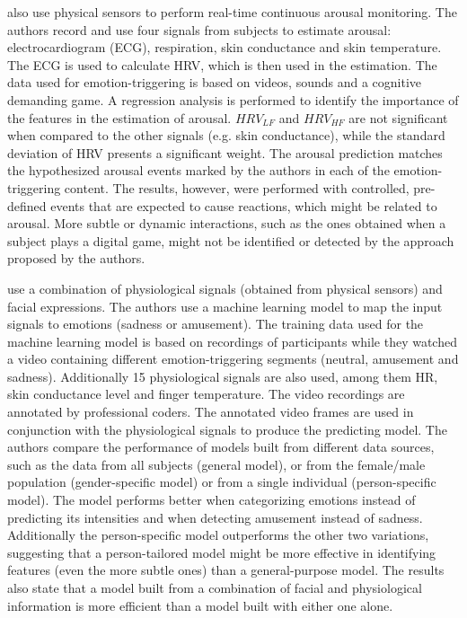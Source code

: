\textcite{grundlehner2009design} also use physical sensors to perform real-time continuous arousal monitoring. The authors record and use four signals from subjects to estimate arousal: electrocardiogram (ECG), respiration, skin conductance and skin temperature. The ECG is used to calculate HRV, which is then used in the estimation. The data used for emotion-triggering is based on videos, sounds and a cognitive demanding game. A regression analysis is performed to identify the importance of the features in the estimation of arousal. $HRV_{LF}$ and $HRV_{HF}$ are not significant when compared to the other signals (e.g. skin conductance), while the standard deviation of HRV presents a significant weight. The arousal prediction matches the hypothesized arousal events marked by the authors in each of the emotion-triggering content. The results, however, were performed with controlled, pre-defined events that are expected to cause reactions, which might be related to arousal. More subtle or dynamic interactions, such as the ones obtained when a subject plays a digital game, might not be identified or detected by the approach proposed by the authors.

\textcite{bailenson2008real} use a combination of physiological signals (obtained from physical sensors) and facial expressions. The authors use a machine learning model to map the input signals to emotions (sadness or amusement). The training data used for the machine learning model is based on recordings of participants while they watched a video containing different emotion-triggering segments (neutral, amusement and sadness). Additionally 15 physiological signals are also used, among them HR, skin conductance level and finger temperature. The video recordings are annotated by professional coders. The annotated video frames are used in conjunction with the physiological signals to produce the predicting model. The authors compare the performance of models built from different data sources, such as the data from all subjects (general model), or from the female/male population (gender-specific model) or from a single individual (person-specific model). The model performs better when categorizing emotions instead of predicting its intensities and when detecting amusement instead of sadness. Additionally the person-specific model outperforms the other two variations, suggesting that a person-tailored model might be more effective in identifying features (even the more subtle ones) than a general-purpose model. The results also state that a model built from a combination of facial and physiological information is more efficient than a model built with either one alone.

